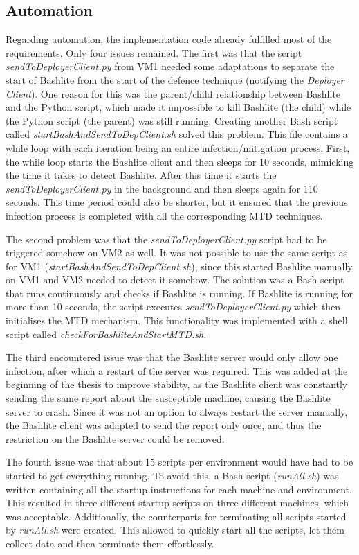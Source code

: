 \subsection{Automation}
Regarding automation, the implementation code already fulfilled most of the requirements. Only four issues remained. The first was that the script \textit{sendToDeployerClient.py} from VM1 needed some adaptations to separate the start of Bashlite from the start of the defence technique (notifying the \textit{Deployer Client}). One reason for this was the parent/child relationship between Bashlite and the Python script, which made it impossible to kill Bashlite (the child) while the Python script (the parent) was still running. Creating another Bash script called \textit{startBashAndSendToDepClient.sh} solved this problem. This file contains a while loop with each iteration being an entire infection/mitigation process. First, the while loop starts the Bashlite client and then sleeps for 10 seconds, mimicking the time it takes to detect Bashlite. After this time it starts the \textit{sendToDeployerClient.py} in the background and then sleeps again for 110 seconds. This time period could also be shorter, but it ensured that the previous infection process is completed with all the corresponding MTD techniques. 

The second problem was that the \textit{sendToDeployerClient.py} script had to be triggered somehow on VM2 as well. It was not possible to use the same script as for VM1 (\textit{startBashAndSendToDepClient.sh}), since this started Bashlite manually on VM1 and VM2 needed to detect it somehow. The solution was a Bash script that runs continuously and checks if Bashlite is running. If Bashlite is running for more than 10 seconds, the script executes \textit{sendToDeployerClient.py} which then initialises the MTD mechanism. This functionality was implemented with a shell script called \textit{checkForBashliteAndStartMTD.sh}. 

The third encountered issue was that the Bashlite server would only allow one infection, after which a restart of the server was required. This was added at the beginning of the thesis to improve stability, as the Bashlite client was constantly sending the same report about the susceptible machine, causing the Bashlite server to crash. Since it was not an option to always restart the server manually, the Bashlite client was adapted to send the report only once, and thus the restriction on the Bashlite server could be removed. 

The fourth issue was that about 15 scripts per environment would have had to be started to get everything running. To avoid this, a Bash script (\textit{runAll.sh}) was written containing all the startup instructions for each machine and environment. This resulted in three different startup scripts on three different machines, which was acceptable. Additionally, the counterparts for terminating all scripts started by \textit{runAll.sh} were created. This allowed to quickly start all the scripts, let them collect data and then terminate them effortlessly.

